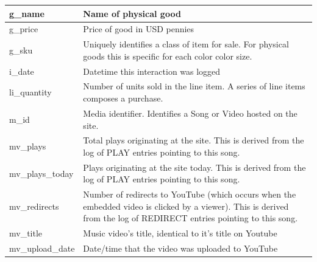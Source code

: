 \documentclass[11pt, a4paper]{report}
\begin{document}
\begin{longtable}{|l|p{10cm}|}
g\_name                 & Name of physical good                                                                                                                                                 \\ \hline
g\_price                & Price of good in USD pennies                                                                                                                                          \\ \hline
g\_sku                  & Uniquely identifies a class of item for sale. For physical goods this is specific for each color color size.                                                          \\ \hline
i\_date                 & Datetime this interaction was logged                                                                                                                                  \\ \hline
li\_quantity            & Number of units sold in the line item. A series of line items composes a purchase.                                                                                    \\ \hline
m\_id                   & Media identifier. Identifies a Song or Video hosted on the site.                                                                                                      \\ \hline
mv\_plays               & Total plays originating at the site. This is derived from the log of PLAY entries pointing to this song.                                                              \\ \hline
mv\_plays\_today        & Plays originating at the site today. This is derived from the log of PLAY entries pointing to this song.                                                              \\ \hline
mv\_redirects           & Number of redirects to YouTube (which occurs when the embedded video is clicked by a viewer). This is derived from the log of REDIRECT entries pointing to this song. \\ \hline
mv\_title               & Music video’s title, identical to it’s title on Youtube                                                                                                               \\ \hline
mv\_upload\_date        & Date/time that the video was uploaded to YouTube                                                                                                                      \\ \hline

\end{longtable}
\end{document}
